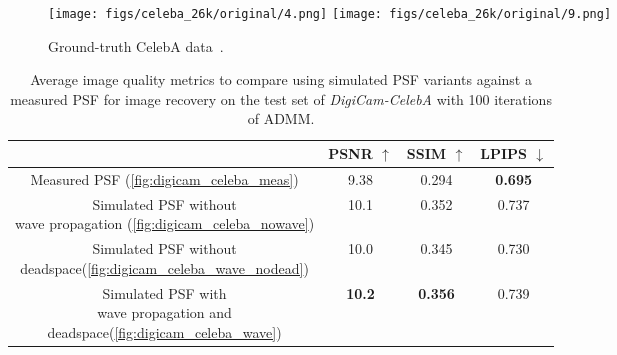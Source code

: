 \begin{figure}[t!]
		\centering
\texttt{[image: figs/celeba\_26k/original/4.png]}
\texttt{[image: figs/celeba\_26k/original/9.png]}
	\caption{Ground-truth CelebA data~\cite{digicam_celeba}.}
	\label{fig:celeba_ground_truth}
\end{figure}

\begin{table}[!t]
	\renewcommand{\arraystretch}{1.3}
	\caption{Average image quality metrics to compare using simulated PSF variants against a measured PSF for image recovery on the test set of \textit{DigiCam-CelebA} with 100 iterations of ADMM.}
	\label{tab:sim_v_meas}
	\centering
	\begin{tabular}{c|c|c|c}
		\hline
		 & PSNR $\uparrow$ & SSIM $\uparrow$ & LPIPS $\downarrow$ \\
		\hline\hline
		Measured PSF (\cref{fig:digicam_celeba_meas}) &   9.38 & 0.294 & \textbf{0.695}  \\
  \hline
  \makecell{Simulated PSF without\\wave propagation (\cref{fig:digicam_celeba_nowave})} & 10.1 & 0.352 & 0.737 \\
  \hline
  \makecell{Simulated PSF without\\deadspace(\cref{fig:digicam_celeba_wave_nodead})} & 10.0 & 0.345 & 0.730 \\
  \hline
  \makecell{Simulated PSF with\\wave propagation  and\\deadspace(\cref{fig:digicam_celeba_wave})} & \textbf{10.2} & \textbf{0.356} & 0.739  \\
  \hline
	\end{tabular}
\end{table}

